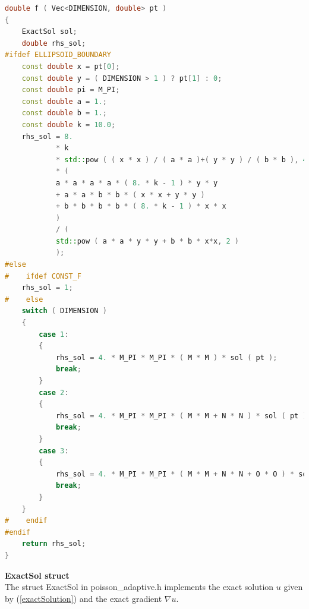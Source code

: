 \documentclass[a4paper, 11pt, twoside]{article}
\begin{document}
\begin{lstlisting}[language=C++, basicstyle={\footnotesize, \ttfamily}, keywordstyle=\color{blue}, numbers=none, tabsize=4]
double f ( Vec<DIMENSION, double> pt )
{
    ExactSol sol;
    double rhs_sol;
#ifdef ELLIPSOID_BOUNDARY
    const double x = pt[0];
    const double y = ( DIMENSION > 1 ) ? pt[1] : 0;
    const double pi = M_PI;
    const double a = 1.;
    const double b = 1.;
    const double k = 10.0;
    rhs_sol = 8.
            * k
            * std::pow ( ( x * x ) / ( a * a )+( y * y ) / ( b * b ), 4. * k )
            * (
            a * a * a * a * ( 8. * k - 1 ) * y * y
            + a * a * b * b * ( x * x + y * y )
            + b * b * b * b * ( 8. * k - 1 ) * x * x
            )
            / (
            std::pow ( a * a * y * y + b * b * x*x, 2 )
            );
#else
#    ifdef CONST_F
    rhs_sol = 1;
#    else
    switch ( DIMENSION )
    {
        case 1:
        {
            rhs_sol = 4. * M_PI * M_PI * ( M * M ) * sol ( pt );
            break;
        }
        case 2:
        {
            rhs_sol = 4. * M_PI * M_PI * ( M * M + N * N ) * sol ( pt );
            break;
        }
        case 3:
        {
            rhs_sol = 4. * M_PI * M_PI * ( M * M + N * N + O * O ) * sol ( pt );
            break;
        }
    }
#    endif
#endif
    return rhs_sol;
}
\end{lstlisting}

\textbf{ExactSol struct}\label{structExactSol}\\
The struct ExactSol in poisson\_adaptive.h implements the exact solution  $u$ given by (\ref{exactSolution}) and the exact gradient $\nabla u$.
\end{document}
